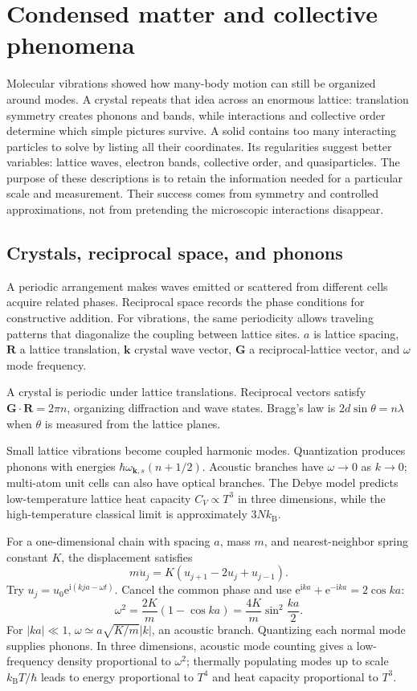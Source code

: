 \documentclass[11pt,oneside]{book}
\newcommand{\ii}{\mathrm{i}}
\newcommand{\ee}{\mathrm{e}}
\newcommand{\vect}[1]{\boldsymbol{#1}}
\newcommand{\kb}{k_{\mathrm B}}
\theoremstyle{reviewstyle}
\begin{document}
\chapter{Condensed matter and collective phenomena}
Molecular vibrations showed how many-body motion can still be organized around modes. A crystal repeats that idea across an enormous lattice: translation symmetry creates phonons and bands, while interactions and collective order determine which simple pictures survive.
A solid contains too many interacting particles to solve by listing all their coordinates. Its regularities suggest better variables: lattice waves, electron bands, collective order, and quasiparticles. The purpose of these descriptions is to retain the information needed for a particular scale and measurement. Their success comes from symmetry and controlled approximations, not from pretending the microscopic interactions disappear.

\section{Crystals, reciprocal space, and phonons}
A periodic arrangement makes waves emitted or scattered from different cells acquire related phases. Reciprocal space records the phase conditions for constructive addition. For vibrations, the same periodicity allows traveling patterns that diagonalize the coupling between lattice sites. $a$ is lattice spacing, $\vect R$ a lattice translation, $\vect k$ crystal wave vector, $\vect G$ a reciprocal-lattice vector, and $\omega$ mode frequency.

A crystal is periodic under lattice translations. Reciprocal vectors satisfy $\vect G\cdot\vect R=2\pi n$, organizing diffraction and wave states. Bragg's law is $2d\sin\theta=n\lambda$ when $\theta$ is measured from the lattice planes.

Small lattice vibrations become coupled harmonic modes. Quantization produces phonons with energies $\hbar\omega_{\vect k,s}(n+1/2)$. Acoustic branches have $\omega\to0$ as $k\to0$; multi-atom unit cells can also have optical branches. The Debye model predicts low-temperature lattice heat capacity $C_V\propto T^3$ in three dimensions, while the high-temperature classical limit is approximately $3N\kb$.

For a one-dimensional chain with spacing $a$, mass $m$, and nearest-neighbor spring constant $K$, the displacement satisfies
\begin{equation}
m\ddot u_j=K(u_{j+1}-2u_j+u_{j-1}).
\end{equation}
Try $u_j=u_0\ee^{\ii(kja-\omega t)}$. Cancel the common phase and use $\ee^{\ii ka}+\ee^{-\ii ka}=2\cos ka$:
\begin{equation}
\omega^2=\frac{2K}{m}(1-\cos ka)
=\frac{4K}{m}\sin^2\frac{ka}{2}.
\end{equation}
For $|ka|\ll1$, $\omega\simeq a\sqrt{K/m}|k|$, an acoustic branch. Quantizing each normal mode supplies phonons. In three dimensions, acoustic mode counting gives a low-frequency density proportional to $\omega^2$; thermally populating modes up to scale $\kb T/\hbar$ leads to energy proportional to $T^4$ and heat capacity proportional to $T^3$.
\end{document}
